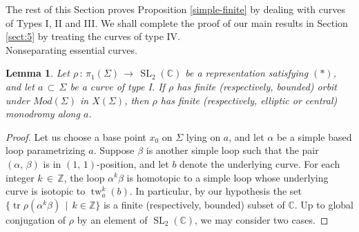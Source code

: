 \documentclass[reqno]{amsart}
\theoremstyle{plain}
\newtheorem{lemma}[theorem]{Lemma}
\theoremstyle{definition}
\theoremstyle{remark}
\newcommand{\C}{{\mathbb{C}}}
\newcommand{\Z}{{\mathbb{Z}}}
\DeclareMathOperator{\SL}{SL}
\DeclareMathOperator{\tw}{tw}
\DeclareMathOperator{\tr}{tr}
\begin{document}
The rest of this Section proves Proposition \ref{simple-finite} by dealing with curves of Types I, II and III.
We shall complete the proof of our main results in Section \ref{sect:5} by treating the curves of type IV.
\\

 Nonseparating essential curves.

\begin{lemma}
\label{type1}
Let $\rho\,:\,\pi_1(\Sigma)\,\to\,\SL_2(\C)$ be a representation satisfying $(*)$, and let
$a\,\subset\,\Sigma$ be a curve of type I. If $\rho$ has finite (respectively, bounded) orbit under
$Mod(\Sigma)$ in $X(\Sigma)$, then $\rho$ has finite (respectively, elliptic or central) monodromy along $a$.
\end{lemma}

\begin{proof}
Let us choose a base point $x_0$ on $\Sigma$ lying on $a$, and let $\alpha$ be a simple based loop 
parametrizing $a$. Suppose $\beta$ is another simple loop such that the pair $(\alpha,\,\beta)$ is in 
$(1,\,1)$-position, and let $b$ denote the underlying curve. For each integer $k\,\in\,\Z$, the loop $\alpha^k\beta$ 
is homotopic to a simple loop whose underlying curve is isotopic to $\tw_a^k(b)$. In particular, by our 
hypothesis the set $\{\tr\rho(\alpha^k\beta)\,\mid\,k\in\Z\}$ is a finite (respectively, bounded) subset of 
$\C$. Up to global conjugation of $\rho$ by an element of $\SL_2(\C)$, we may consider two cases.


\end{proof}
\end{document}
